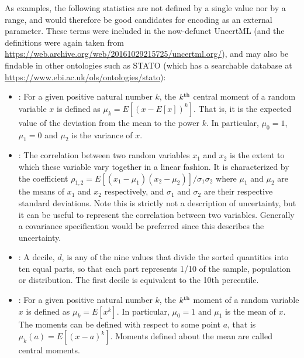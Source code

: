 \documentclass[draftspec]{sbmlpkgspec}
\begin{document}
As examples, the following statistics are not defined by a single value nor by a range, and would therefore be good candidates for encoding as an external parameter.  These terms were included in the now-defunct UncertML (and the definitions were again taken from \url{https://web.archive.org/web/20161029215725/uncertml.org/}), and may also be findable in other ontologies such as STATO (which has a searchable database at \url{https://www.ebi.ac.uk/ols/ontologies/stato}):

\begin{itemize}
\item {}:  For a given positive natural number $ k $, the $ k\textsuperscript{th} $ central moment of a random variable $ x $ is defined as $ \mu_k = E[(x - E[x])^k] $. That is, it is the expected value of the deviation from the mean to the power $ k $. In particular, $ \mu_0 = 1 $, $ \mu_1 = 0 $ and $ \mu_2 $ is the variance of $ x $.

\item {}:  The correlation between two random variables $ x_1 $ and $ x_2 $ is the extent to which these variable vary together in a linear fashion. It is characterized by the coefficient $ \rho_{1,2} = E[(x_1-\mu_1)(x_2-\mu_2)] / \sigma_1\sigma_2 $ where $ \mu_1 $ and $ \mu_2 $ are the means of $ x_1 $ and $ x_2 $ respectively, and $ \sigma_1 $ and $ \sigma_2 $ are their respective standard deviations. Note this is strictly not a description of uncertainty, but it can be useful to represent the correlation between two variables. Generally a covariance specification would be preferred since this describes the uncertainty.

\item {}:  A decile, $ d $, is any of the nine values that divide the sorted quantities into ten equal parts, so that each part represents 1/10 of the sample, population or distribution. The first decile is equivalent to the 10th percentile.

\item {}:  For a given positive natural number $ k $, the $ k\textsuperscript{th} $ moment of a random variable $ x $ is defined as $ \mu_k = E[x^k] $. In particular, $ \mu_0 = 1 $ and $ \mu_1 $ is the mean of $ x $.
The moments can be defined with respect to some point $ a $, that is $ \mu_k(a) = E[(x - a)^k] $. Moments defined about the mean are called central moments.


\end{itemize}
\end{document}
